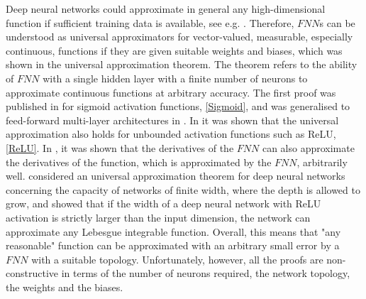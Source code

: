 Deep neural networks could approximate in general any high-dimensional function if sufficient training data is available, see e.g. \cite{ArzaniDawson:2021}. Therefore, $FNN$s can be understood as universal approximators for vector-valued, measurable, especially continuous, functions if they are given suitable weights and biases, which was shown in the universal approximation theorem. The theorem refers to the ability of $FNN$ with a single hidden layer with a finite number of neurons to approximate continuous functions at arbitrary accuracy. The first proof was published in \cite{Cybenko:1989} for sigmoid activation functions, \cref{Sigmoid}, and was generalised to feed-forward multi-layer architectures in \cite{Hornik:1991}. In \cite{SonodaMurata:2017} it was shown that the universal approximation also holds for unbounded activation functions such as ReLU, \cref{ReLU}. In \cite{HornikStinchcombeWhite:1990}, it was shown that the derivatives of the $FNN$ can also approximate the derivatives of the function, which is approximated by the $FNN$, arbitrarily well. \cite{LuPuWangHuWang:2017} considered an universal approximation theorem for deep neural networks concerning the capacity of networks of finite width, where the depth is allowed to grow, and showed that if the width of a deep neural network with ReLU activation is strictly larger than the input dimension, the network can approximate any Lebesgue integrable function. Overall, this means that "any reasonable" function can be approximated with an arbitrary small error by a $FNN$ with a suitable topology. Unfortunately, however, all the proofs are non-constructive in terms of the number of neurons required, the network topology, the weights and the biases. \\

